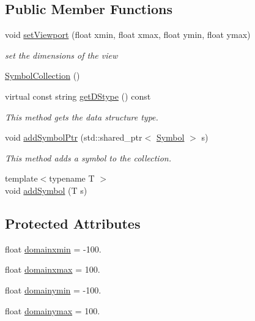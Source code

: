 \subsection*{Public Member Functions}
\begin{DoxyCompactItemize}
\item 
void \hyperlink{classbridges_1_1datastructure_1_1_symbol_collection_a8853f758e4e8ab7f9cef5bf4d0494027}{set\+Viewport} (float xmin, float xmax, float ymin, float ymax)
\begin{DoxyCompactList}\small\item\em set the dimensions of the view \end{DoxyCompactList}\item 
\hyperlink{classbridges_1_1datastructure_1_1_symbol_collection_aa8d074ecf235848f4253b19d6f5c7c74}{Symbol\+Collection} ()
\item 
virtual const string \hyperlink{classbridges_1_1datastructure_1_1_symbol_collection_a8f63c31a48a12127978967b706fc38f5}{get\+D\+Stype} () const
\begin{DoxyCompactList}\small\item\em This method gets the data structure type. \end{DoxyCompactList}\item 
void \hyperlink{classbridges_1_1datastructure_1_1_symbol_collection_aca0190ac7cedcab02bd2fd2c8b688248}{add\+Symbol\+Ptr} (std\+::shared\+\_\+ptr$<$ \hyperlink{classbridges_1_1datastructure_1_1_symbol}{Symbol} $>$ s)
\begin{DoxyCompactList}\small\item\em This method adds a symbol to the collection. \end{DoxyCompactList}\item 
{\footnotesize template$<$typename T $>$ }\\void \hyperlink{classbridges_1_1datastructure_1_1_symbol_collection_a3038a04d7686a85981986d21b7e74664}{add\+Symbol} (T s)
\end{DoxyCompactItemize}
\subsection*{Protected Attributes}
\begin{DoxyCompactItemize}
\item 
float \hyperlink{classbridges_1_1datastructure_1_1_symbol_collection_a3db2f9c5d239e4ca964ea017a2beedac}{domainxmin} = -\/100.
\item 
float \hyperlink{classbridges_1_1datastructure_1_1_symbol_collection_a424f539a0a7cc48735f58978bb37249b}{domainxmax} = 100.
\item 
float \hyperlink{classbridges_1_1datastructure_1_1_symbol_collection_a2f08353c46444762f329bec94f087a2b}{domainymin} = -\/100.
\item 
float \hyperlink{classbridges_1_1datastructure_1_1_symbol_collection_a62b61a0ec9546c68f31a324ff6e6b518}{domainymax} = 100.
\end{DoxyCompactItemize}


